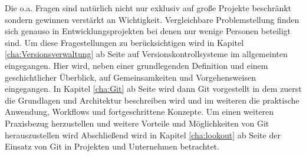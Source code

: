Die o.a. Fragen sind natürlich nicht nur exklusiv auf große Projekte beschränkt
sondern gewinnen verstärkt an Wichtigkeit. Vergleichbare Problemstellung finden
sich genauso in Entwicklungsprojekten bei denen nur wenige Personen beteiligt
sind. Um diese Fragestellungen zu berücksichtigen wird in Kapitel
\ref{cha:Versionsverwaltung} ab Seite \pageref{cha:Versionsverwaltung} auf
Versionskontrollsysteme im allgemeinten eingegangen. Hier wird, neben einer
grundlegenden Definition und einem geschichtlicher Überblick, auf
Gemeinsamkeiten und Vorgehensweisen eingegangen. In Kapitel \ref{cha:Git} ab
Seite \pageref{cha:Git} wird dann Git vorgestellt in dem zuerst die Grundlagen
und Architektur beschreiben wird und im weiteren die praktische Anwendung,
Workflows und fortgeschrittene Konzepte. Um einen weiteren Praxisbezug
herzustellen und weitere Vorteile und Möglichkeiten von Git herauszustellen
wird Abschließend wird in Kapitel \ref{cha:lookout} ab Seite
\pageref{cha:lookout} der Einsatz von Git in Projekten und Unternehmen
betrachtet.
